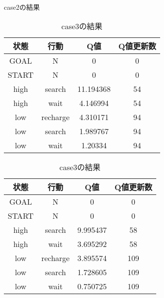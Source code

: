 \begin{table}
  \begin{minipage}[t]{0.45\hsize}
    \centering
    \caption{case2の結果}
    \label{table:4}
    \begin{tabular}{|c|c|c|c|}
      \hline
      状態 & 行動 & Q値 & Q値更新数\\
      \hline
      GOAL & N & 0 & 0 \\
      START & N & 0 & 0 \\
      high & search & 11.194368 & 54 \\
      high & wait & 4.146994 & 54 \\
      low & recharge & 4.310171 & 94 \\
      low & search & 1.989767 & 94 \\
      low & wait & 1.20334 & 94 \\
      \hline
    \end{tabular}
  \end{minipage}
  \begin{minipage}[t]{0.45\hsize}
    \centering
    \caption{case3の結果}
    \label{table:5}
      \begin{tabular}{|c|c|c|c|}
        \hline
        状態 & 行動 & Q値 & Q値更新数\\
        \hline
        GOAL & N & 0 & 0 \\
        START & N & 0 & 0 \\
        high & search & 9.995437 & 58 \\
        high & wait & 3.695292 & 58 \\
        low & recharge & 3.895574 & 109 \\
        low & search & 1.728605 & 109 \\
        low & wait & 0.750725 & 109 \\
        \hline
      \end{tabular}
    \end{minipage}
\end{table}

